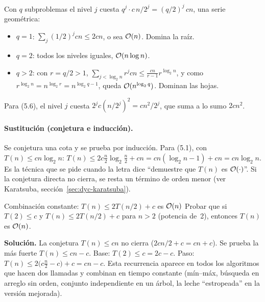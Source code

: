 \begin{center}
\end{center}

Con $q$ subproblemas el nivel $j$ cuesta $q^j\cdot c\,n/2^j=(q/2)^j\,cn$, una serie geométrica:
\begin{itemize}
  \item $q=1$: $\sum_j (1/2)^j cn\le 2cn$, o sea $\mathcal{O}(n)$. Domina la raíz.
  \item $q=2$: todos los niveles iguales, $\mathcal{O}(n\log n)$.
  \item $q>2$: con $r=q/2>1$, $\sum_{j<\log_2 n} r^j cn\le \frac{cn}{r-1}r^{\log_2 n}$, y como $r^{\log_2 n}=n^{\log_2 r}=n^{\log_2 q-1}$, queda $\mathcal{O}(n^{\log_2 q})$. Dominan las hojas.
\end{itemize}
Para (5.6), el nivel $j$ cuesta $2^j c(n/2^j)^2=cn^2/2^j$, que suma a lo sumo $2cn^2$.

\paragraph{Sustitución (conjetura e inducción).} Se conjetura una cota y se prueba por inducción. Para (5.1), con $T(n)\le cn\log_2 n$: $T(n)\le 2c\frac n2\log_2\frac n2+cn=cn(\log_2 n-1)+cn=cn\log_2 n$. Es la técnica que se pide cuando la letra dice ``demuestre que $T(n)$ es $\mathcal{O}(\cdot)$''. Si la conjetura directa no cierra, se resta un término de orden menor (ver Karatsuba, sección~\ref{sec:dyc-karatsuba}).

\begin{problema}{Combinación constante: $T(n)\le 2T(n/2)+c$ es $\mathcal{O}(n)$}
Probar que si $T(2)\le c$ y $T(n)\le 2T(n/2)+c$ para $n>2$ (potencia de~2), entonces $T(n)$ es $\mathcal{O}(n)$.

\textbf{Solución.} La conjetura $T(n)\le cn$ no cierra ($2cn/2+c=cn+c$). Se prueba la más fuerte $T(n)\le cn-c$. Base: $T(2)\le c=2c-c$. Paso: $T(n)\le 2\bigl(c\frac n2-c\bigr)+c=cn-c$. Esta recurrencia aparece en todos los algoritmos que hacen dos llamadas y combinan en tiempo constante (mín--máx, búsqueda en arreglo sin orden, conjunto independiente en un árbol, la leche ``estropeada'' en la versión mejorada).
\end{problema}

